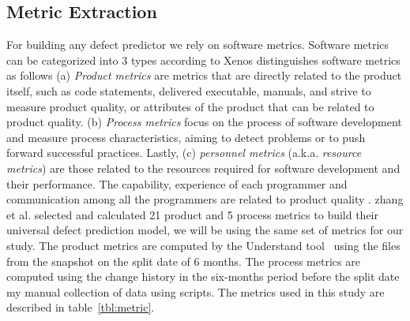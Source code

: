 \documentclass[10pt,journal,compsoc]{IEEEtran}
\begin{document}
\subsection{Metric Extraction}
\label{sec:Metric Extraction}

For building any defect predictor we rely on software metrics. Software metrics can be categorized into 3 types according to Xenos \cite{Xenos} distinguishes software metrics as  follows (a) {\em Product metrics} are metrics that are directly related to the product itself, such as code statements, delivered executable, manuals, and strive to measure product quality, or attributes of the product that can be related to product quality. (b) {\em Process metrics} focus on the process of software development and measure process characteristics, aiming to detect problems or to push forward successful practices. Lastly, (c) {\em personnel metrics} (a.k.a. {\em resource metrics}) are those related to the resources required for software development and their performance. The capability, experience of each programmer and communication among all the programmers are related to product quality \cite{wolf2009predicting,de2004sometimes,cataldo2013coordination,cataldo2007coordination}. zhang et al. selected and calculated 21 product and 5 process metrics to build their universal defect prediction model, we will be using the same set of metrics for our study. The product metrics are computed by the Understand tool~\cite{visualize} using the files from the snapshot on the split date of 6 months. The process metrics are computed using the change history in the six-months period before the split date my manual collection of data using scripts. The metrics used in this study are described in table~\ref{tbl:metric}.
\end{document}
